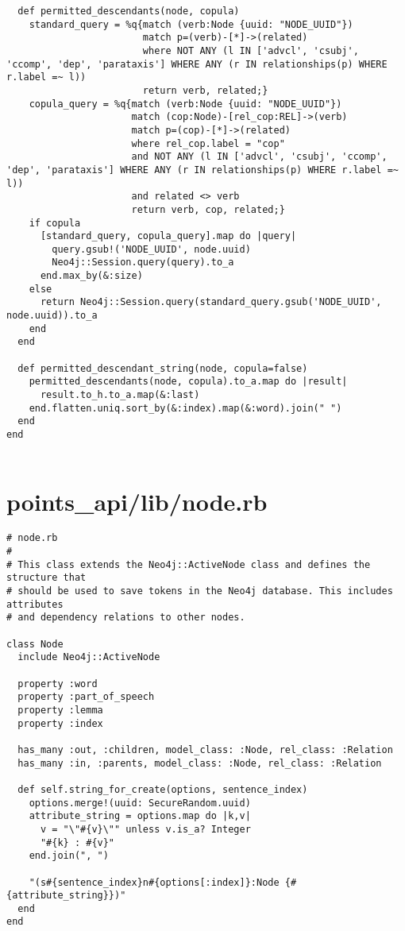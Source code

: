 \documentclass{article}
\begin{document}
\begin{verbatim}
  def permitted_descendants(node, copula)
    standard_query = %q{match (verb:Node {uuid: "NODE_UUID"})
                        match p=(verb)-[*]->(related)
                        where NOT ANY (l IN ['advcl', 'csubj', 'ccomp', 'dep', 'parataxis'] WHERE ANY (r IN relationships(p) WHERE r.label =~ l))
                        return verb, related;}
    copula_query = %q{match (verb:Node {uuid: "NODE_UUID"})
                      match (cop:Node)-[rel_cop:REL]->(verb)
                      match p=(cop)-[*]->(related)
                      where rel_cop.label = "cop"
                      and NOT ANY (l IN ['advcl', 'csubj', 'ccomp', 'dep', 'parataxis'] WHERE ANY (r IN relationships(p) WHERE r.label =~ l))
                      and related <> verb
                      return verb, cop, related;}
    if copula
      [standard_query, copula_query].map do |query|
        query.gsub!('NODE_UUID', node.uuid)
        Neo4j::Session.query(query).to_a
      end.max_by(&:size)
    else
      return Neo4j::Session.query(standard_query.gsub('NODE_UUID', node.uuid)).to_a
    end
  end

  def permitted_descendant_string(node, copula=false)
    permitted_descendants(node, copula).to_a.map do |result|
      result.to_h.to_a.map(&:last)
    end.flatten.uniq.sort_by(&:index).map(&:word).join(" ")
  end
end


\end{verbatim}
\pagebreak

\section*{points\_api/lib/node.rb}
\begin{verbatim}
# node.rb
#
# This class extends the Neo4j::ActiveNode class and defines the structure that
# should be used to save tokens in the Neo4j database. This includes attributes
# and dependency relations to other nodes.

class Node
  include Neo4j::ActiveNode

  property :word
  property :part_of_speech
  property :lemma
  property :index

  has_many :out, :children, model_class: :Node, rel_class: :Relation
  has_many :in, :parents, model_class: :Node, rel_class: :Relation

  def self.string_for_create(options, sentence_index)
    options.merge!(uuid: SecureRandom.uuid)
    attribute_string = options.map do |k,v|
      v = "\"#{v}\"" unless v.is_a? Integer
      "#{k} : #{v}"
    end.join(", ")

    "(s#{sentence_index}n#{options[:index]}:Node {#{attribute_string}})"
  end
end


\end{verbatim}
\pagebreak
\end{document}
